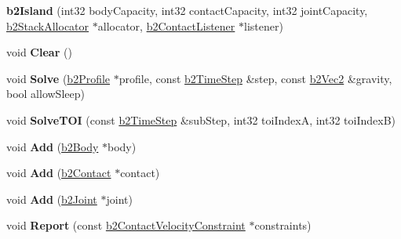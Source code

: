 \begin{DoxyCompactItemize}
\mbox{\label{classb2Island_a2f2258f09d2663dcb35a1d69d16896cb}} 
{\bfseries b2\+Island} (int32 body\+Capacity, int32 contact\+Capacity, int32 joint\+Capacity, \hyperlink{classb2StackAllocator}{b2\+Stack\+Allocator} $\ast$allocator, \hyperlink{classb2ContactListener}{b2\+Contact\+Listener} $\ast$listener)
\item 
\mbox{\label{classb2Island_a26566f7388fcaf7523446e5e76d99c4d}} 
void {\bfseries Clear} ()
\item 
\mbox{\label{classb2Island_a28a6f74174cde3a6e93663c740f418fa}} 
void {\bfseries Solve} (\hyperlink{structb2Profile}{b2\+Profile} $\ast$profile, const \hyperlink{structb2TimeStep}{b2\+Time\+Step} \&step, const \hyperlink{structb2Vec2}{b2\+Vec2} \&gravity, bool allow\+Sleep)
\item 
\mbox{\label{classb2Island_a61f577b473962bb0d8add1f55eeef7ee}} 
void {\bfseries Solve\+T\+OI} (const \hyperlink{structb2TimeStep}{b2\+Time\+Step} \&sub\+Step, int32 toi\+IndexA, int32 toi\+IndexB)
\item 
\mbox{\label{classb2Island_af2d54861bd063051c0a6dc5f73b27c3e}} 
void {\bfseries Add} (\hyperlink{classb2Body}{b2\+Body} $\ast$body)
\item 
\mbox{\label{classb2Island_abc0ea9208e818b551404fd507f197a51}} 
void {\bfseries Add} (\hyperlink{classb2Contact}{b2\+Contact} $\ast$contact)
\item 
\mbox{\label{classb2Island_a04e6ccd0c11f6ef5a7ed0a926d081445}} 
void {\bfseries Add} (\hyperlink{classb2Joint}{b2\+Joint} $\ast$joint)
\item 
\mbox{\label{classb2Island_a57620f76faf000f61c76e925e40e6129}} 
void {\bfseries Report} (const \hyperlink{structb2ContactVelocityConstraint}{b2\+Contact\+Velocity\+Constraint} $\ast$constraints)
\end{DoxyCompactItemize}
